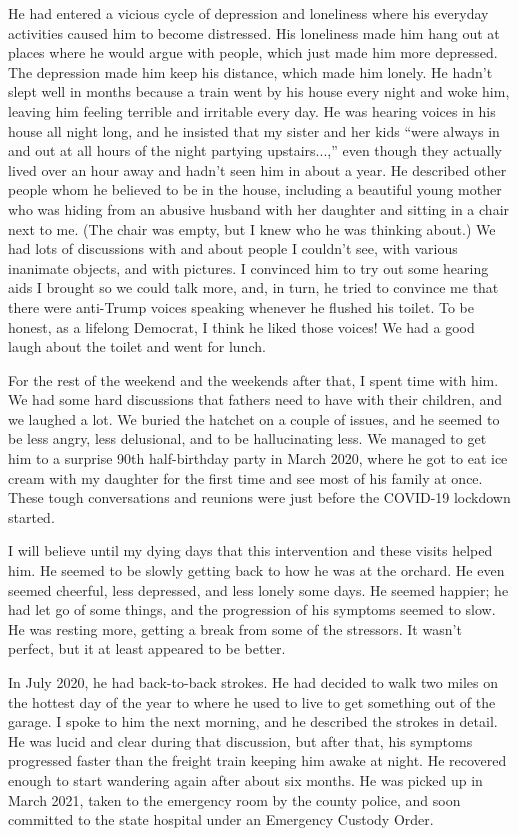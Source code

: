 \documentclass{article}
\begin{document}
He had entered a vicious cycle of depression and loneliness where his everyday activities caused him to become distressed. His loneliness made him hang out at places where he would argue with people, which just made him more depressed. The depression made him keep his distance, which made him lonely. He hadn't slept well in months because a train went by his house every night and woke him, leaving him feeling terrible and irritable every day. He was hearing voices in his house all night long, and he insisted that my sister and her kids ``were always in and out at all hours of the night partying upstairs...,'' even though they actually lived over an hour away and hadn't seen him in about a year. He described other people whom he believed to be in the house, including a beautiful young mother who was hiding from an abusive husband with her daughter and sitting in a chair next to me. (The chair was empty, but I knew who he was thinking about.)  We had lots of discussions with and about people I couldn't see, with various inanimate objects, and with pictures. I convinced him to try out some hearing aids I brought so we could talk more, and, in turn, he tried to convince me that there were anti-Trump voices speaking whenever he flushed his toilet. To be honest, as a lifelong Democrat, I think he liked those voices! We had a good laugh about the toilet and went for lunch.

For the rest of the weekend and the weekends after that, I spent time with him. We had some hard discussions that fathers need to have with their children, and we laughed a lot. We buried the hatchet on a couple of issues, and he seemed to be less angry, less delusional, and to be hallucinating less. We managed to get him to a surprise 90th half-birthday party in March 2020, where he got to eat ice cream with my daughter for the first time and see most of his family at once. These tough conversations and reunions were just before the COVID-19 lockdown started.

I will believe until my dying days that this intervention and these visits helped him. He seemed to be slowly getting back to how he was at the orchard. He even seemed cheerful, less depressed, and less lonely some days. He seemed happier; he had let go of some things, and the progression of his symptoms seemed to slow. He was resting more, getting a break from some of the stressors. It wasn't perfect, but it at least appeared to be better.

In July 2020, he had back-to-back strokes. He had decided to walk two miles on the hottest day of the year to where he used to live to get something out of the garage. I spoke to him the next morning, and he described the strokes in detail. He was lucid and clear during that discussion, but after that, his symptoms progressed faster than the freight train keeping him awake at night. He recovered enough to start wandering again after about six months. He was picked up in March 2021, taken to the emergency room by the county police, and soon committed to the state hospital under an Emergency Custody Order. 
\end{document}
